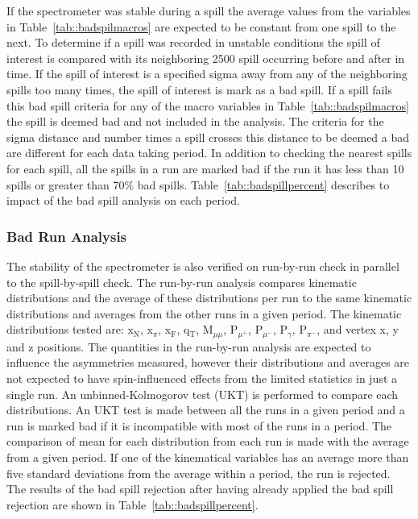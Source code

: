 If the spectrometer was stable during a spill the average values from the
variables in Table~\ref{tab::badspilmacros} are expected to be constant from one
spill to the next.  To determine if a spill was recorded in unstable conditions
the spill of interest is compared with its neighboring 2500 spill occurring
before and after in time.  If the spill of interest is a specified sigma away
from any of the neighboring spills too many times, the spill of interest is mark
as a bad spill.  If a spill fails this bad spill criteria for any of the macro
variables in Table~\ref{tab::badspilmacros} the spill is deemed bad and not
included in the analysis.  The criteria for the sigma distance and number
times a spill crosses this distance to be deemed a bad are different for each
data taking period.  In addition to checking the nearest spills for each spill,
all the spills in a run are marked bad if the run it has less than 10 spills or
greater than 70\% bad spills.  Table~\ref{tab::badspillpercent} describes to
impact of the bad spill analysis on each period. \par

\subsubsection{Bad Run Analysis}
The stability of the spectrometer is also verified on run-by-run check in
parallel to the spill-by-spill check.  The run-by-run analysis compares
kinematic distributions and the average of these distributions per run to the
same kinematic distributions and averages from the other runs in a given period.
The kinematic distributions tested are: x$_{\mathrm{N}}$, x$_{\pi}$,
x$_{\mathrm{F}}$, q$_{\mathrm{T}}$, M$_{\mu\mu}$, P$_{\mu^+}$, P$_{\mu^-}$,
P$_{\gamma}$, P$_{\pi^-}$, and vertex x, y and z positions.  The quantities in
the run-by-run analysis are expected to influence the asymmetries
measured, however their distributions and averages are not expected to have
spin-influenced effects from the limited statistics in just a single run.  An
unbinned-Kolmogorov test (UKT) is performed to compare each distributions.  An
UKT test is made between all the runs in a given period and a run is marked bad
if it is incompatible with most of the runs in a period.  The comparison of mean
for each distribution from each run is made with the average from a given
period.  If one of the kinematical variables has an average more than five
standard deviations from the average within a period, the run is rejected.  The
results of the bad spill rejection after having already applied the bad spill
rejection are shown in Table~\ref{tab::badspillpercent}.

